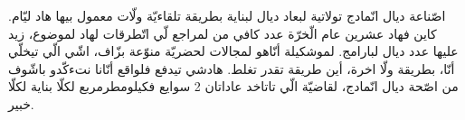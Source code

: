 اصّناعة ديال انّمادج تولاتية لبعاد ديال لبناية بطريقة تلقاءيّة ولّات معمول بيها هاد ليّام.
كاين فهاد عشرين عام الّخرّة عدد كافي من لمراجع لّي اتّطرقات لهاد لموضوع، زيد عليها عدد ديال لبارامج.
لموشكيلة أنّاهو لمجالات لحضريّة منوّعة بزّاف، اشّي الّي تيخلّي أنّا، بطريقة ولّا اخرة، أين طريقة تقدر تغلط.
هادشي تيدفع فلواقع أنّانا نتءكّدو باشّوف من اصّحة ديال انّمادج، لقاضيّة الّي تاتاخد عاداتان 2 سوايع فكيلومطرمربع لكلّا بناية لكلّا خبير.
